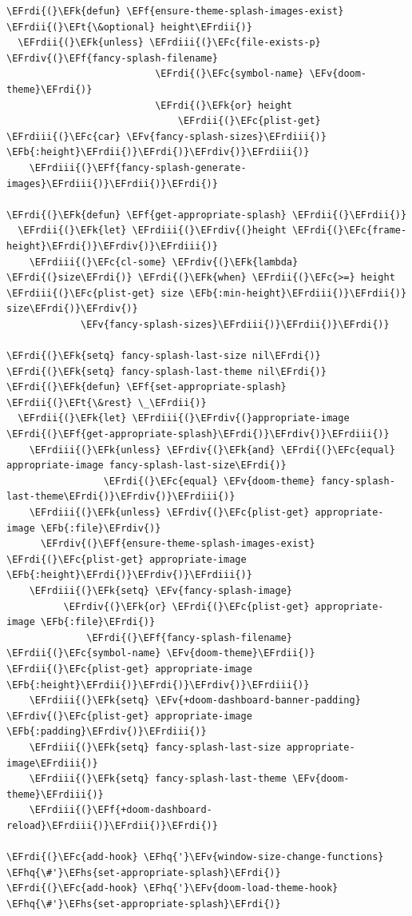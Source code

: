 \documentclass{scrartcl}
\newcommand{\EFk}[1]{\textcolor{EFk}{#1}} %
\newcommand{\EFt}[1]{\textcolor{EFt}{#1}} %
\newcommand{\EFb}[1]{\textcolor{EFb}{#1}} %
\newcommand{\EFc}[1]{\textcolor{EFc}{#1}} %
\newcommand{\EFv}[1]{\textcolor{EFv}{#1}} %
\newcommand{\EFf}[1]{\textcolor{EFf}{#1}} %
\newcommand{\EFhq}[1]{\textcolor{EFhq}{#1}} %
\newcommand{\EFhs}[1]{\textcolor{EFhs}{#1}} %
\newcommand{\EFrdi}[1]{\textcolor{EFrdi}{#1}} %
\newcommand{\EFrdii}[1]{\textcolor{EFrdii}{#1}} %
\newcommand{\EFrdiii}[1]{\textcolor{EFrdiii}{#1}} %
\newcommand{\EFrdiv}[1]{\textcolor{EFrdiv}{#1}} %
\begin{document}
\begin{Code}
\begin{Verbatim}[]
\EFrdi{(}\EFk{defun} \EFf{ensure-theme-splash-images-exist} \EFrdii{(}\EFt{\&optional} height\EFrdii{)}
  \EFrdii{(}\EFk{unless} \EFrdiii{(}\EFc{file-exists-p} \EFrdiv{(}\EFf{fancy-splash-filename}
                          \EFrdi{(}\EFc{symbol-name} \EFv{doom-theme}\EFrdi{)}
                          \EFrdi{(}\EFk{or} height
                              \EFrdii{(}\EFc{plist-get} \EFrdiii{(}\EFc{car} \EFv{fancy-splash-sizes}\EFrdiii{)} \EFb{:height}\EFrdii{)}\EFrdi{)}\EFrdiv{)}\EFrdiii{)}
    \EFrdiii{(}\EFf{fancy-splash-generate-images}\EFrdiii{)}\EFrdii{)}\EFrdi{)}

\EFrdi{(}\EFk{defun} \EFf{get-appropriate-splash} \EFrdii{(}\EFrdii{)}
  \EFrdii{(}\EFk{let} \EFrdiii{(}\EFrdiv{(}height \EFrdi{(}\EFc{frame-height}\EFrdi{)}\EFrdiv{)}\EFrdiii{)}
    \EFrdiii{(}\EFc{cl-some} \EFrdiv{(}\EFk{lambda} \EFrdi{(}size\EFrdi{)} \EFrdi{(}\EFk{when} \EFrdii{(}\EFc{>=} height \EFrdiii{(}\EFc{plist-get} size \EFb{:min-height}\EFrdiii{)}\EFrdii{)} size\EFrdi{)}\EFrdiv{)}
             \EFv{fancy-splash-sizes}\EFrdiii{)}\EFrdii{)}\EFrdi{)}

\EFrdi{(}\EFk{setq} fancy-splash-last-size nil\EFrdi{)}
\EFrdi{(}\EFk{setq} fancy-splash-last-theme nil\EFrdi{)}
\EFrdi{(}\EFk{defun} \EFf{set-appropriate-splash} \EFrdii{(}\EFt{\&rest} \_\EFrdii{)}
  \EFrdii{(}\EFk{let} \EFrdiii{(}\EFrdiv{(}appropriate-image \EFrdi{(}\EFf{get-appropriate-splash}\EFrdi{)}\EFrdiv{)}\EFrdiii{)}
    \EFrdiii{(}\EFk{unless} \EFrdiv{(}\EFk{and} \EFrdi{(}\EFc{equal} appropriate-image fancy-splash-last-size\EFrdi{)}
                 \EFrdi{(}\EFc{equal} \EFv{doom-theme} fancy-splash-last-theme\EFrdi{)}\EFrdiv{)}\EFrdiii{)}
    \EFrdiii{(}\EFk{unless} \EFrdiv{(}\EFc{plist-get} appropriate-image \EFb{:file}\EFrdiv{)}
      \EFrdiv{(}\EFf{ensure-theme-splash-images-exist} \EFrdi{(}\EFc{plist-get} appropriate-image \EFb{:height}\EFrdi{)}\EFrdiv{)}\EFrdiii{)}
    \EFrdiii{(}\EFk{setq} \EFv{fancy-splash-image}
          \EFrdiv{(}\EFk{or} \EFrdi{(}\EFc{plist-get} appropriate-image \EFb{:file}\EFrdi{)}
              \EFrdi{(}\EFf{fancy-splash-filename} \EFrdii{(}\EFc{symbol-name} \EFv{doom-theme}\EFrdii{)} \EFrdii{(}\EFc{plist-get} appropriate-image \EFb{:height}\EFrdii{)}\EFrdi{)}\EFrdiv{)}\EFrdiii{)}
    \EFrdiii{(}\EFk{setq} \EFv{+doom-dashboard-banner-padding} \EFrdiv{(}\EFc{plist-get} appropriate-image \EFb{:padding}\EFrdiv{)}\EFrdiii{)}
    \EFrdiii{(}\EFk{setq} fancy-splash-last-size appropriate-image\EFrdiii{)}
    \EFrdiii{(}\EFk{setq} fancy-splash-last-theme \EFv{doom-theme}\EFrdiii{)}
    \EFrdiii{(}\EFf{+doom-dashboard-reload}\EFrdiii{)}\EFrdii{)}\EFrdi{)}

\EFrdi{(}\EFc{add-hook} \EFhq{'}\EFv{window-size-change-functions} \EFhq{\#'}\EFhs{set-appropriate-splash}\EFrdi{)}
\EFrdi{(}\EFc{add-hook} \EFhq{'}\EFv{doom-load-theme-hook} \EFhq{\#'}\EFhs{set-appropriate-splash}\EFrdi{)}
\end{Verbatim}
\end{Code}
\end{document}
